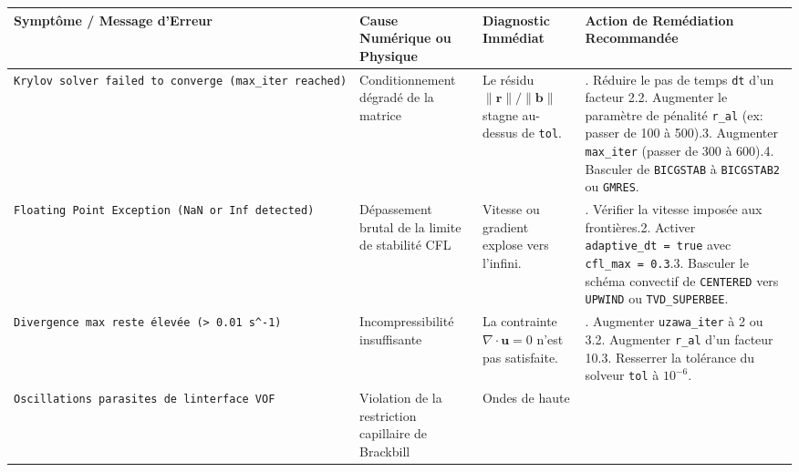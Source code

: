 \documentclass[
  french,
]{article}
\newcounter{none} %
\begin{document}
{\def\LTcaptype{none} %
\begin{longtable}[]{@{}
  >{\raggedright\arraybackslash}p{}
  >{\raggedright\arraybackslash}p{}
  >{\raggedright\arraybackslash}p{}
  >{\raggedright\arraybackslash}p{}@{}}
\toprule\noalign{}
\begin{minipage}[b]{\linewidth}\raggedright
Symptôme / Message d'Erreur
\end{minipage} & \begin{minipage}[b]{\linewidth}\raggedright
Cause Numérique ou Physique
\end{minipage} & \begin{minipage}[b]{\linewidth}\raggedright
Diagnostic Immédiat
\end{minipage} & \begin{minipage}[b]{\linewidth}\raggedright
Action de Remédiation Recommandée
\end{minipage} \\
\midrule\noalign{}
\endhead
\bottomrule\noalign{}
\endlastfoot
\texttt{Krylov\ solver\ failed\ to\ converge\ (max\_iter\ reached)} &
Conditionnement dégradé de la matrice & Le résidu
\(\|\mathbf{r}\|/\|\mathbf{b}\|\) stagne au-dessus de \texttt{tol}. & 1.
Réduire le pas de temps \texttt{dt} d'un facteur 2.2. Augmenter le
paramètre de pénalité \texttt{r\_al} (ex: passer de 100 à 500).3.
Augmenter \texttt{max\_iter} (passer de 300 à 600).4. Basculer de
\texttt{BICGSTAB} à \texttt{BICGSTAB2} ou \texttt{GMRES}. \\
\texttt{Floating\ Point\ Exception\ (NaN\ or\ Inf\ detected)} &
Dépassement brutal de la limite de stabilité CFL & Vitesse ou gradient
explose vers l'infini. & 1. Vérifier la vitesse imposée aux
frontières.2. Activer \texttt{adaptive\_dt\ =\ true} avec
\texttt{cfl\_max\ =\ 0.3}.3. Basculer le schéma convectif de
\texttt{CENTERED} vers \texttt{UPWIND} ou \texttt{TVD\_SUPERBEE}. \\
\texttt{Divergence\ max\ reste\ élevée\ (\textgreater{}\ 0.01\ s\^{}-1)}
& Incompressibilité insuffisante & La contrainte
\(\nabla \cdot \mathbf{u} = 0\) n'est pas satisfaite. & 1. Augmenter
\texttt{uzawa\_iter} à 2 ou 3.2. Augmenter \texttt{r\_al} d'un facteur
10.3. Resserrer la tolérance du solveur \texttt{tol} à \(10^{-6}\). \\
\texttt{Oscillations\ parasites\ de\ l\textquotesingle{}interface\ VOF}
& Violation de la restriction capillaire de Brackbill & Ondes de haute

\end{longtable}}
\end{document}
